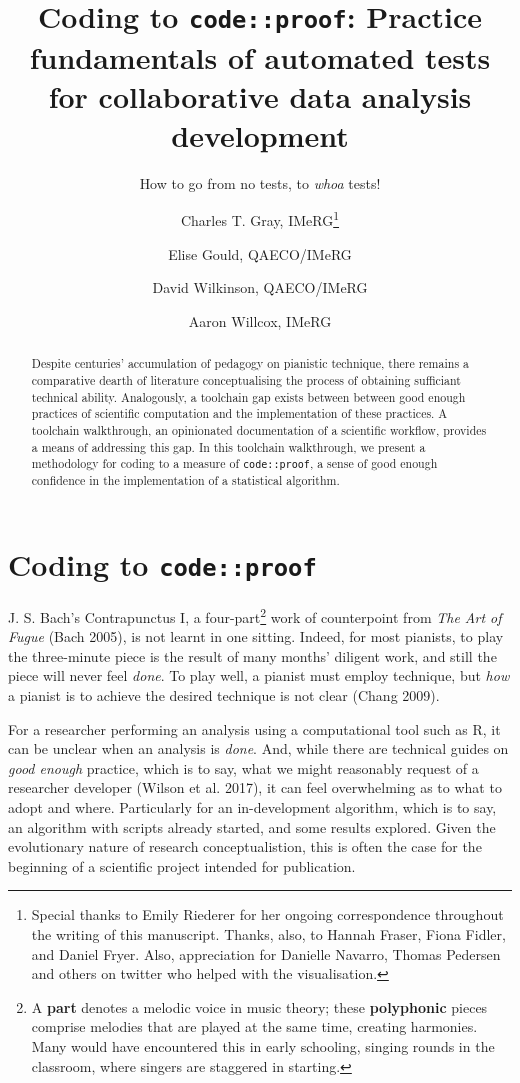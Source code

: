 \documentclass[
]{article}
\title{Coding to \texttt{code::proof}: Practice fundamentals of automated tests for collaborative data analysis development}
\subtitle{How to go from no tests, to \emph{whoa} tests!}
\author{Charles T. Gray, IMeRG\footnote{Special thanks to Emily Riederer for her ongoing correspondence throughout the writing of this manuscript. Thanks, also, to Hannah Fraser, Fiona Fidler, and Daniel Fryer. Also, appreciation for Danielle Navarro, Thomas Pedersen and others on twitter who helped with the visualisation.} \and Elise Gould, QAECO/IMeRG \and David Wilkinson, QAECO/IMeRG \and Aaron Willcox, IMeRG}
\date{}
\begin{document}
\maketitle
\begin{abstract}
Despite centuries' accumulation of pedagogy on pianistic technique, there remains a comparative dearth of literature conceptualising the process of obtaining sufficiant technical ability. Analogously, a toolchain gap exists between between good enough practices of scientific computation and the implementation of these practices. A toolchain walkthrough, an opinionated documentation of a scientific workflow, provides a means of addressing this gap. In this toolchain walkthrough, we present a methodology for coding to a measure of \texttt{code::proof}, a sense of good enough confidence in the implementation of a statistical algorithm.
\end{abstract}

\newcommand{\codereg}[1]{
\fbox{\begin{minipage}{15em}
#1
\end{minipage}}
}

{
\setcounter{tocdepth}{2}
\tableofcontents
}
\hypertarget{coding-to-codeproof}{%
\section{\texorpdfstring{Coding to \texttt{code::proof}}{Coding to code::proof}}\label{coding-to-codeproof}}

J. S. Bach's Contrapunctus I, a four-part\footnote{A \textbf{part} denotes a melodic voice in music theory; these \textbf{polyphonic} pieces comprise melodies that are played at the same time, creating harmonies. Many would have encountered this in early schooling, singing rounds in the classroom, where singers are staggered in starting.} work of counterpoint from \emph{The Art of Fugue} (Bach 2005), is not learnt in one sitting. Indeed, for most pianists, to play the three-minute piece is the result of many months' diligent work, and still the piece will never feel \emph{done}. To play well, a pianist must employ technique, but \emph{how} a pianist is to achieve the desired technique is not clear (Chang 2009).

For a researcher performing an analysis using a computational tool such as R, it can be unclear when an analysis is \emph{done}. And, while there are technical guides on \emph{good enough} practice, which is to say, what we might reasonably request of a researcher developer (Wilson et al. 2017), it can feel overwhelming as to what to adopt and where. Particularly for an in-development algorithm, which is to say, an algorithm with scripts already started, and some results explored. Given the evolutionary nature of research conceptualistion, this is often the case for the beginning of a scientific project intended for publication.
\end{document}
